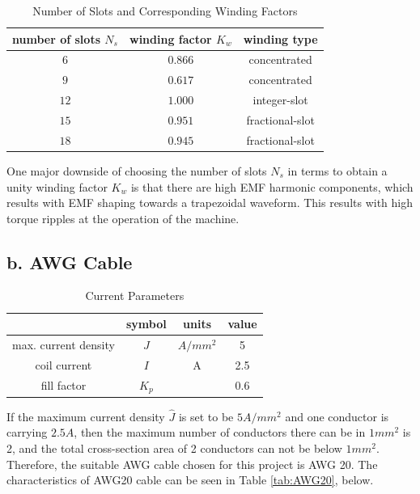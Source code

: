 \documentclass[a4paper, 11pt, titlepage]{article}
\begin{document}
\begin{table}[h]
	\begin{center}
		\begin{tabular}{c|c|c}
			number of slots $N_s$ & winding factor $K_w$ & winding type \\
			\hline
			$6$ & $0.866$ & concentrated \\
			\hline
			$9$ & $0.617$ & concentrated \\
			\hline
			$12$ & $1.000$ & integer-slot \\
			\hline
			$15$ & $0.951$ & fractional-slot \\
			\hline
			$18$ & $0.945$ & fractional-slot \\
			\hline
		\end{tabular}
	\end{center}
	\caption{Number of Slots and Corresponding Winding Factors}
	\label{fig:NsvsKw}
\end{table}

One major downside of choosing the number of slots $N_s$ in terms to obtain a unity winding factor $K_w$ is that there are high EMF harmonic components, which results with EMF shaping towards a trapezoidal waveform. This results with high torque ripples at the operation of the machine.

\subsection{b. AWG Cable}

\begin{table}[h]
	\begin{center}
		\begin{tabular}{c|c|c|c}
			 & symbol & units & value \\
			\hline
			max. current density & $J$ & $A/mm^2$ & 5 \\
			coil current & $I$ & A & 2.5 \\ 
			fill factor & $K_p$ & & 0.6 \\
			\hline
		\end{tabular}
	\end{center}
	\caption{Current Parameters}
	\label{fig:currentParameters}
\end{table}


If the maximum current density $\hat{J}$ is set to be $5 A/mm^2$ and one conductor is carrying $2.5A$, then the maximum number of conductors there can be in $1mm^2$ is 2, and the total cross-section area of 2 conductors can not be below $1mm^2$. Therefore, the suitable AWG cable chosen for this project is AWG 20. The characteristics of AWG20 cable can be seen in Table \ref{tab:AWG20}, below.
\end{document}
